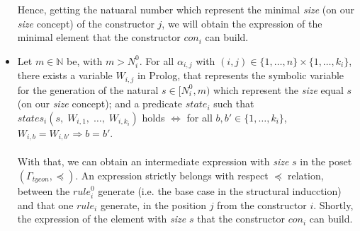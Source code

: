\documentclass{report}
\theoremstyle{definition}
\theoremstyle{definition}
\begin{document}
\begin{itemize}
	Hence, getting the natuaral number which represent the minimal \textit{size} (on our \textit{size} concept) of the constructor $j$, we will obtain the expression of the minimal element that the constructor $con_i$ can build.
	\item Let $m \in \mathbb{N}$ be, with $m > N_{i}^{0}$. For all $\alpha_{i,j}$ with $(i,j) \in \{1, \ldots, n \} \times \{1, \ldots, k_i \}$, there exists a variable $W_{i,j}$ in Prolog, that represents the symbolic variable for the generation of the natural $s \in [N_{i}^{0}, m )$ which represent the \textit{size} equal $s$ (on our \textit{size} concept); and a predicate $state_{i}$ such that $states_i(s, \; W_{i,1}, \; \ldots, \; W_{i,k_i})$ holds $\Longleftrightarrow $ for all $b,b' \in \{1, \ldots, k_i \}$,  $W_{i,b}=W_{i,b'} \Rightarrow b = b'$.\\\\
	With that, we can obtain an intermediate expression with \textit{size} $s$ in the poset $(\Gamma_{tycon}, \preceq)$. An expression strictly belongs with respect $\preceq$ relation, between the $rule_{i}^{0}$ generate (i.e. the base case in the structural inducction) and that one $rule_i$ generate, in the position $j$ from the constructor $i$. Shortly, the expression of the element with \textit{size} $s$ that the constructor $con_i$ can build.
\end{itemize}
\end{document}
